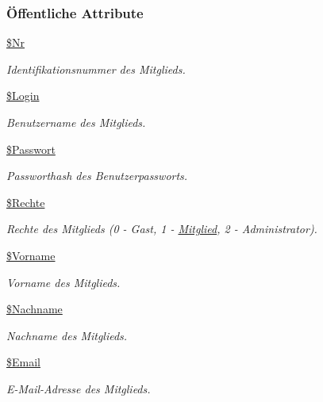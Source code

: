 \subsubsection*{\"{O}ffentliche Attribute}
\begin{CompactItemize}
\item 
\hyperlink{classMitglied_113efe44273361b7c167c729666ad04c}{\$Nr}
\begin{CompactList}\small\item\em Identifikationsnummer des Mitglieds. \item\end{CompactList}\item 
\hyperlink{classMitglied_626ee2f2551cc2840bdeac6a04491b2e}{\$Login}
\begin{CompactList}\small\item\em Benutzername des Mitglieds. \item\end{CompactList}\item 
\hyperlink{classMitglied_94f43b65c468ad42ac45be064d015446}{\$Passwort}
\begin{CompactList}\small\item\em Passworthash des Benutzerpassworts. \item\end{CompactList}\item 
\hyperlink{classMitglied_adadc54a72a46a089ddec43855ba3c7e}{\$Rechte}
\begin{CompactList}\small\item\em Rechte des Mitglieds (0 - Gast, 1 - \hyperlink{classMitglied}{Mitglied}, 2 - Administrator). \item\end{CompactList}\item 
\hyperlink{classMitglied_157424daca1ecda5b6f6a3e0f24ecfce}{\$Vorname}
\begin{CompactList}\small\item\em Vorname des Mitglieds. \item\end{CompactList}\item 
\hyperlink{classMitglied_635def9ec266748689397299c7f79d9c}{\$Nachname}
\begin{CompactList}\small\item\em Nachname des Mitglieds. \item\end{CompactList}\item 
\hyperlink{classMitglied_4be6b837c482ac912188663380d31122}{\$Email}
\begin{CompactList}\small\item\em E-Mail-Adresse des Mitglieds. \item\end{CompactList}\end{CompactItemize}


